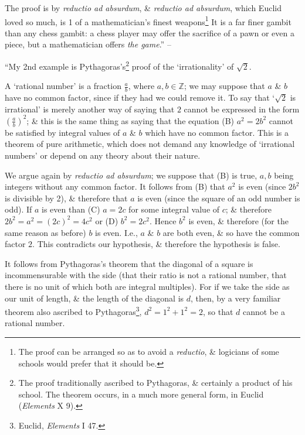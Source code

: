 \documentclass{article}
\numberwithin{equation}{section}
\begin{document}
The proof is by \textit{reductio ad absurdum}, \& \textit{reductio ad absurdum}, which Euclid loved so much, is 1 of a mathematician's finest weapons\footnote{The proof can be arranged so as to avoid a \textit{reductio}, \& logicians of some schools would prefer that it should be.} It is a far finer gambit than any chess gambit: a chess player may offer the sacrifice of a pawn or even a piece, but a mathematician offers \textit{the game}.'' -- \cite[pp. 91--94]{Hardy1992}

 ``My 2nd example is Pythagoras's\footnote{The proof traditionally ascribed to Pythagoras, \& certainly a product of his school. The theorem occurs, in a much more general form, in Euclid (\textit{Elements} X 9).} proof of the `irrationality' of $\sqrt{2}$.

A `rational number' is a fraction $\frac{a}{b}$, where $a,b\in\mathbb{Z}$; we may suppose that $a$ \& $b$ have no common factor, since if they had we could remove it. To say that `$\sqrt{2}$ is irrational' is merely another way of saying that $2$ cannot be expressed in the form $\left(\frac{a}{b}\right)^2$; \& this is the same thing as saying that the equation (B) $a^2 = 2b^2$ cannot be satisfied by integral values of $a$ \& $b$ which have no common factor. This is a theorem of pure arithmetic, which does not demand any knowledge of `irrational numbers' or depend on any theory about their nature.

We argue again by \textit{reductio ad absurdum}; we suppose that (B) is true, $a,b$ being integers without any common factor. It follows from (B) that $a^2$ is even (since $2b^2$ is divisible by 2), \& therefore that $a$ is even (since the square of an odd number is odd). If $a$ is even than (C) $a = 2c$ for some integral value of $c$; \& therefore $2b^2 = a^2 = (2c)^2 = 4c^2$ or (D) $b^2 = 2c^2$. Hence $b^2$ is even, \& therefore (for the same reason as before) $b$ is even. I.e., $a$ \& $b$ are both even, \& so have the common factor $2$. This contradicts our hypothesis, \& therefore the hypothesis is false.

It follows from Pythagoras's theorem that the diagonal of a square is incommensurable with the side (that their ratio is not a rational number, that there is no unit of which both are integral multiples). For if we take the side as our unit of length, \& the length of the diagonal is $d$, then, by a very familiar theorem also ascribed to Pythagoras\footnote{Euclid, \textit{Elements} I 47.}, $d^2 = 1^2 + 1^2 = 2$, so that $d$ cannot be a rational number.
\end{document}
